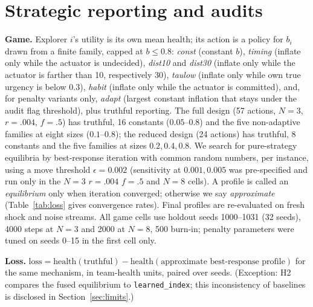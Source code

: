 \documentclass[10pt]{article}
\begin{document}
\section{Strategic reporting and audits}\label{sec:game}
\textbf{Game.} Explorer $i$'s utility is its own mean health; its action is a policy for $b_i$ drawn from a finite family, capped at $b\le0.8$: \emph{const} (constant $b$), \emph{timing} (inflate only while the actuator is undecided), \emph{dist10} and \emph{dist30} (inflate only while the actuator is farther than 10, respectively 30), \emph{taulow} (inflate only while own true urgency is below $0.3$), \emph{habit} (inflate only while the actuator is committed), and, for penalty variants only, \emph{adapt} (largest constant inflation that stays under the audit flag threshold), plus truthful reporting. The full design (57 actions, $N{=}3$, $r{=}.004$, $f{=}.5$) has truthful, 16 constants ($0.05$--$0.8$) and the five non-adaptive families at eight sizes ($0.1$--$0.8$); the reduced design (24 actions) has truthful, 8 constants and the five families at sizes $0.2,0.4,0.8$. We search for pure-strategy equilibria by best-response iteration with common random numbers, per instance, using a move threshold $\epsilon=0.002$ (sensitivity at $0.001,0.005$ was pre-specified and run only in the $N{=}3$ $r{=}.004$ $f{=}.5$ and $N{=}8$ cells). A profile is called an \emph{equilibrium} only when iteration converged; otherwise we say \emph{approximate} (Table~\ref{tab:loss} gives convergence rates). Final profiles are re-evaluated on fresh shock and noise streams. All game cells use holdout seeds 1000--1031 (32 seeds), 4000 steps at $N{=}3$ and 2000 at $N{=}8$, 500 burn-in; penalty parameters were tuned on seeds 0--15 in the first cell only.

\textbf{Loss.} $\text{loss}=\text{health}(\text{truthful})-\text{health}(\text{approximate best-response profile})$ for the same mechanism, in team-health units, paired over seeds. (Exception: H2 compares the fused equilibrium to \texttt{learned\_index}; this inconsistency of baselines is disclosed in Section~\ref{sec:limits}.)
\end{document}
